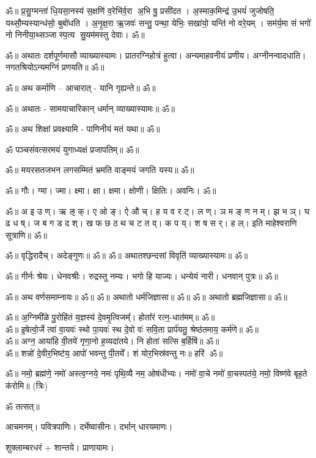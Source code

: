 ॐ॥ प्र॒सु॒ग्मन्ता॑ धि॒यसा॒नस्य॑ स॒क्षणि॑ व॒रेभि॑र्व॒रा अ॒भि षु॒ प्रसी॑दत । अ॒स्माक॒मिन्द्र॑ उ॒भयं॑
जुजोषति॒ यथ्सौ॒म्यस्यान्ध॑सो॒ बुबो॑धति । अ॒नृ॒क्ष॒रा ऋ॒जवः॑ सन्तु॒ पन्था॒ येभिः॒ सखा॑यो॒ यन्ति॑ नो
वरे॒यम् । सम॑र्य॒मा सं भगो॑ नो निनीया॒थ्सञ्जास्प॒त्य सु॒यम॑मस्तु देवाः। ॐ॥

ॐ॥ अथातः दर्शपूर्णमासौ व्याख्यास्यामः। प्रातरग्निहोत्रं हुत्वा। अन्यमाहवनीयं प्रणीय।
अग्नीनन्वादधाति। नगतश्रियोऽन्यमग्निं प्रणयति॥ ॐ॥ 

ॐ॥ अथ कर्माणि -- आचारात् - यानि गृह्यन्ते॥ ॐ॥  

ॐ॥  अथातः - सामयाचारिकान् धर्मान् व्याख्यास्यामः॥ ॐ॥

ॐ॥ अथ शिक्षां प्रवक्ष्यामि - पाणिनीयं मतं यथा॥ ॐ॥

ॐ पञ्चसंवत्सरमयं युगाध्यक्षं प्रजापतिम्॥ ॐ॥

ॐ॥ मयरसतजभन लगसम्मितं भ्रमति वाङ्मयं जगति यस्य॥ ॐ॥

ॐ॥ गौः। ग्मा। ज्मा। क्ष्मा। क्षा। क्षमा। क्षोणी। क्षितिः। अवनिः। ॐ॥

ॐ॥ अ इ उ ण्। ऋ ऌ क्। ए ओ ङ्। ऐ औ च्। ह य व र ट्। ल ण्। ञ म ङ् ण न म्।
झ भ ञ्। घ ढ ध ष्। ज ब ग ड द श्। ख फ छ ठ थ च ट त व्।
क प य्। श ष स र्। ह ल्। इति माहेश्वराणि सूत्राणि॥ ॐ॥

ॐ॥ वृद्धिरादैच्। अदेङ्गुणः॥ ॐ॥  
ॐ॥ अथातश्छन्दसां विवृतिं व्याख्यास्यामः॥ ॐ॥ 

ॐ॥ गीर्नः श्रेयः। धेनवश्रीः। रुद्रस्तु नम्यः। भगो हि याज्यः।
धन्येयं नारी। धनवान् पुत्रः॥ ॐ॥

ॐ॥ अथ वर्णसमाम्नायः॥ ॐ॥
ॐ॥ अथातो धर्मजिज्ञासा॥ ॐ॥
ॐ॥ अथातो ब्रह्मजिज्ञासा॥ ॐ॥

ॐ॥ अ॒ग्निमी᳚ळे पु॒रोहि॑तं य॒ज्ञस्य॑ दे॒वमृ॒त्विजम्᳚। होता᳚रं रत्न॒-धात॑मम्॥ ॐ॥\\
ॐ॥ इ॒षेत्वो॒र्जे त्वा॑ वा॒यवः॑ स्थो पा॒यवः॑ स्थ दे॒वो वः॑ सवि॒ता प्रार्प॑यतु॒ श्रेष्ठ॑तमाय॒ कर्म॑णे॥ ॐ॥\\
ॐ॥ अग्न॒ आया॑हि वी॒तये॑ गृणा॒नो ह॒व्यदा॑तये। नि होता॑ सत्सि ब॒र्हिषि॑॥ ॐ॥\\
ॐ॥ शन्नो॑ दे॒वीर॒भिष्ट॑य॒ आपो॑ भवन्तु पी॒तये᳚। शं योर॒भिस्र॑वन्तु नः॥ हरि॑ ॐ॥

ॐ॥ नमो॒ ब्रह्म॑णे॒ नमो॑ अस्त्व॒ग्नये॒ नमः॑ पृथि॒व्यै नम॒ ओष॑धीभ्यः।
नमो॑ वा॒चे नमो॑ वा॒चस्पत॑ये॒ नमो॒ विष्ण॑वे बृह॒ते क॑रोमि॥ (त्रिः)

ॐ तत्सत्॥


आचमनम्। पवित्रपाणिः। दर्भेष्वासीनः। दर्भान् धारयमाणः।

शुक्लाम्बरधरं + शान्तये। प्राणायामः।

